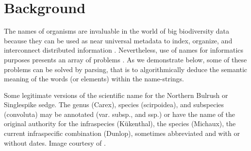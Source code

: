 \documentclass{bmcart}
\begin{document}
\section*{Background}

The names of organisms are invaluable in the world of big biodiversity data
because they can be used as near universal metadata to index, organize, and
interconnect distributed information \cite{Patterson2010}. Nevertheless, use of
names for informatics purposes presents an array of problems . As we
demonstrate below, some of these problems can be solved by parsing, that is to
algorithmically deduce the semantic meaning of the words (or elements) within
the name-strings.

\begin{table}[!htb]
  \begin{center}

  \caption{Some legitimate versions of the scientific name for the Northern
    Bulrush or Singlespike sedge.  The genus (Carex), species (scirpoidea),
    and subspecies (convoluta) may be annotated (var. subsp., and ssp.) or
    have the name of the original authority for the infraspecies (Kükenthal),
    the species (Michaux), the current infraspecific combination (Dunlop),
    sometimes abbreviated and with or without dates. Image courtesy of
  \cite{FNA2002}.}\label{table:carex}


\end{center}
\end{table}
\end{document}

